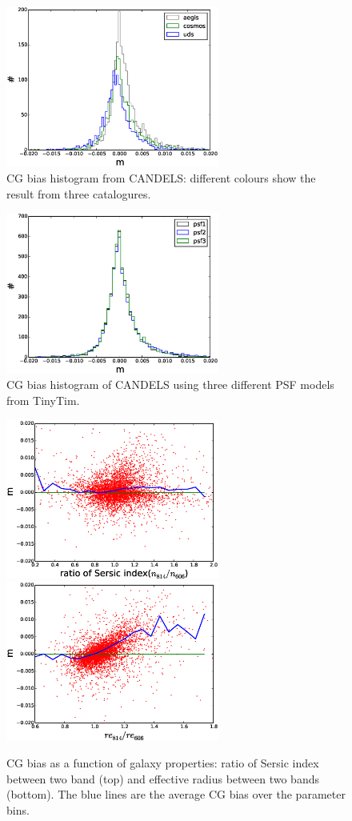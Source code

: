 \documentclass[useAMS,usenatbib]{mn2e}
\begin{document}
%
\begin{figure}
  \includegraphics[width=7.0cm]{zhiscgb.eps}
\caption{CG bias histogram from CANDELS: different colours show the
  result from three catalogures. %
}
\label{fig:cgbhis}
\end{figure}
%
\begin{figure}
  \includegraphics[width=7.0cm]{zcgbhis_psf.eps}
  \caption{CG bias histogram of CANDELS using three different PSF
    models from TinyTim.}
  \label{fig:candelspsf}
\end{figure}
%
\begin{figure}
\includegraphics[width=7.0cm]{zcgb-ne16.eps}
\includegraphics[width=7.0cm]{zcgb-re16.eps}
\caption{CG bias as a function of galaxy properties: ratio of Sersic
  index between two band (top) and effective radius between two bands
  (bottom). The blue lines are the average CG bias over the parameter
  bins.}
\label{fig:cg2fitpar}
\end{figure}
\end{document}
